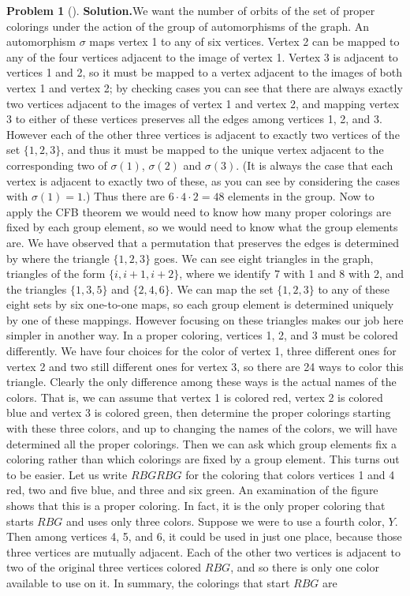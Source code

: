 \documentclass[10pt,]{book}
\theoremstyle{plain}
\theoremstyle{definition}
\newtheorem{activity}[project]{Problem}
\theoremstyle{definition}
\numberwithin{equation}{chapter}
\begin{document}
\begin{activity}[]
\textbf{Solution.}\quad We want the number of orbits of the set of proper colorings under the action of the group of automorphisms of the graph. An automorphism \(\sigma\) maps vertex 1 to any of six vertices. Vertex 2 can be mapped to any of the four vertices adjacent to the image of vertex 1. Vertex 3 is adjacent to vertices 1 and 2, so it must be mapped to a vertex adjacent to the images of both vertex 1 and vertex 2; by checking cases you can see that there are always exactly two vertices adjacent to the images of vertex 1 and vertex 2, and mapping vertex 3 to either of these vertices preserves all the edges among vertices 1, 2, and 3. However each of the other three vertices is adjacent to exactly two vertices of the set \(\{1,2,3\}\), and thus it must be mapped to the unique vertex adjacent to the corresponding two of \(\sigma(1)\), \(\sigma(2)\) and \(\sigma(3)\). (It is always the case that each vertex is adjacent to exactly two of these, as you can see by considering the cases with \(\sigma(1)=1\).) Thus there are \(6\cdot4\cdot2=48\) elements in the group. Now to apply the CFB theorem we would need to know how many proper colorings are fixed by each group element, so we would need to know what the group elements are. We have observed that a permutation that preserves the edges is determined by where the triangle \(\{1,2,3\}\) goes. We can see eight triangles in the graph, triangles of the form \(\{i,i+1,i+2\}\), where we identify 7 with 1 and 8 with 2, and the triangles \(\{1,3,5\}\) and \(\{2,4,6\}\). We can map the set \(\{1,2,3\}\) to any of these eight sets by six one-to-one maps, so each group element is determined uniquely by one of these mappings. However focusing on these triangles makes our job here simpler in another way. In a proper coloring, vertices 1, 2, and 3 must be colored differently. We have four choices for the color of vertex 1, three different ones for vertex 2 and two still different ones for vertex 3, so there are 24 ways to color this triangle. Clearly the only difference among these ways is the actual names of the colors. That is, we can assume that vertex 1 is colored red, vertex 2 is colored blue and vertex 3 is colored green, then determine the proper colorings starting with these three colors, and up to changing the names of the colors, we will have determined all the proper colorings. Then we can ask which group elements fix a coloring rather than which colorings are fixed by a group element. This turns out to be easier. Let us write \(RBGRBG\) for the coloring that colors vertices 1 and 4 red, two and five blue, and three and six green. An examination of the figure shows that this is a proper coloring. In fact, it is the only proper coloring that starts \(RBG\) and uses only three colors. Suppose we were to use a fourth color, \(Y\). Then among vertices 4, 5, and 6, it could be used in just one place, because those three vertices are mutually adjacent. Each of the other two vertices is adjacent to two of the original three vertices colored \(RBG\), and so there is only one color available to use on it. In summary, the colorings that start \(RBG\) are \leavevmode%

\end{activity}
\end{document}
